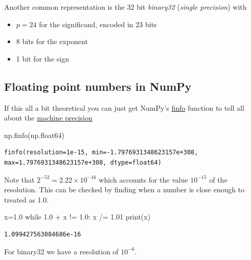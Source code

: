 \documentclass[
  letterpaper,
  DIV=11,
  numbers=noendperiod]{scrreprt}
\newenvironment{Shaded}{\begin{snugshade}}{\end{snugshade}}
\newcommand{\BuiltInTok}[1]{\textcolor[rgb]{0.00,0.23,0.31}{#1}}
\newcommand{\ControlFlowTok}[1]{\textcolor[rgb]{0.00,0.23,0.31}{#1}}
\newcommand{\FloatTok}[1]{\textcolor[rgb]{0.68,0.00,0.00}{#1}}
\newcommand{\NormalTok}[1]{\textcolor[rgb]{0.00,0.23,0.31}{#1}}
\newcommand{\OperatorTok}[1]{\textcolor[rgb]{0.37,0.37,0.37}{#1}}
\providecommand{\tightlist}{%
  \setlength{\itemsep}{0pt}\setlength{\parskip}{0pt}}\usepackage{longtable,booktabs,array}
\theoremstyle{definition}
\theoremstyle{remark}
\begin{document}
Another common representation is the 32 bit \emph{binary32}
(\emph{single precision}) with

\begin{itemize}
\tightlist
\item
  \(p=24\) for the significand, encoded in 23 bits
\item
  8 bits for the exponent
\item
  1 bit for the sign
\end{itemize}

\hypertarget{sec-fp-numpy}{%
\subsection{Floating point numbers in NumPy}\label{sec-fp-numpy}}

If this all a bit theoretical you can just get NumPy's
\href{https://numpy.org/doc/stable/reference/generated/numpy.finfo.html}{finfo}
function to tell all about the
\href{https://en.wikipedia.org/wiki/Machine_epsilon}{machine precision}

\begin{Shaded}
\begin{Highlighting}[]
\NormalTok{np.finfo(np.float64)}
\end{Highlighting}
\end{Shaded}

\begin{verbatim}
finfo(resolution=1e-15, min=-1.7976931348623157e+308, max=1.7976931348623157e+308, dtype=float64)
\end{verbatim}

Note that \(2^{-52}=2.22\times 10^{-16}\) which accounts for the value
\(10^{-15}\) of the resolution. This can be checked by finding when a
number is close enough to treated as 1.0.

\begin{Shaded}
\begin{Highlighting}[]
\NormalTok{x}\OperatorTok{=}\FloatTok{1.0}
\ControlFlowTok{while} \FloatTok{1.0} \OperatorTok{+}\NormalTok{ x }\OperatorTok{!=} \FloatTok{1.0}\NormalTok{:}
\NormalTok{    x }\OperatorTok{/=} \FloatTok{1.01} 
\BuiltInTok{print}\NormalTok{(x)}
\end{Highlighting}
\end{Shaded}

\begin{verbatim}
1.099427563084686e-16
\end{verbatim}

For binary32 we have a resolution of \(10^{-6}\).
\end{document}
